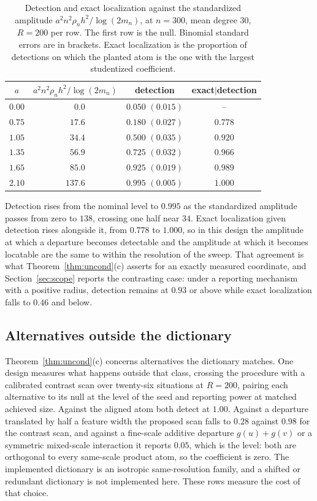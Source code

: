 \documentclass[11pt]{article}
\theoremstyle{definition}
\newcommand{\1}{\mathbf 1}\newcommand{\op}{\operatorname}
\begin{document}
\begin{table}[t]\centering
\caption{Detection and exact localization against the standardized amplitude
$a^2n^2\rho_nh^2/\log(2m_n)$, at $n=300$, mean degree $30$, $R=200$ per row.
The first row is the null.  Binomial standard errors are in brackets.  Exact
localization is the proportion of detections on which the planted atom is the
one with the largest studentized coefficient.}
                                                         \label{tab:boundary}
\begin{tabular}{cccc}
\hline
$a$ & $a^2n^2\rho_nh^2/\log(2m_n)$ & detection & exact$\mid$detection\\
\hline
$0.00$ & $\phantom{00}0.0$ & $0.050$ $(0.015)$ & --\\
$0.75$ & $\phantom{0}17.6$ & $0.180$ $(0.027)$ & $0.778$\\
$1.05$ & $\phantom{0}34.4$ & $0.500$ $(0.035)$ & $0.920$\\
$1.35$ & $\phantom{0}56.9$ & $0.725$ $(0.032)$ & $0.966$\\
$1.65$ & $\phantom{0}85.0$ & $0.925$ $(0.019)$ & $0.989$\\
$2.10$ & $137.6$ & $0.995$ $(0.005)$ & $1.000$\\
\hline
\end{tabular}
\end{table}

Detection rises from the nominal level to $0.995$ as the standardized
amplitude passes from zero to $138$, crossing one half near $34$.  Exact
localization given detection rises alongside it, from $0.778$ to $1.000$, so
in this design the amplitude at which a departure becomes detectable and the
amplitude at which it becomes locatable are the same to within the resolution
of the sweep.  That agreement is what Theorem~\ref{thm:uncond}(c) asserts for
an exactly measured coordinate, and Section~\ref{sec:scope} reports the
contrasting case: under a reporting mechanism with a positive radius,
detection remains at $0.93$ or above while exact localization falls to $0.46$
and below.

\subsection{Alternatives outside the dictionary}   \label{sec:regime}

Theorem~\ref{thm:uncond}(c) concerns alternatives the dictionary matches.  One
design measures what happens outside that class, crossing the procedure with a
calibrated contrast scan over twenty-six situations at $R=200$, pairing each
alternative to its null at the level of the seed and reporting power at
matched achieved size.  Against the aligned atom both detect at $1.00$.
Against a departure translated by half a feature width the proposed scan falls
to $0.28$ against $0.98$ for the contrast scan, and against a fine-scale
additive departure $g(u)+g(v)$ or a symmetric mixed-scale interaction it
reports $0.05$, which is the level: both are orthogonal to every same-scale
product atom, so the coefficient is zero.  The implemented dictionary is an
isotropic same-resolution family, and a shifted or redundant dictionary is not
implemented here.  These rows measure the cost of that choice.
\end{document}
